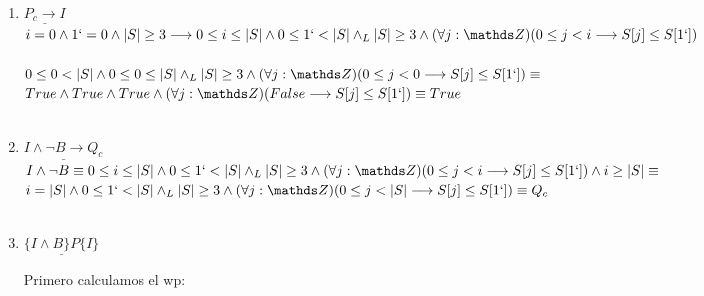 \documentclass[10pt,a4paper]{article}
\begin{document}
\begin{enumerate}

    \newpage
    \item $\underline{P_c\longrightarrow I}$\\

    $i=0 \land 1`=0 \land |S|\geq 3 \longrightarrow 0\leq i \leq |S| \land 0 \leq 1`<|S|  \land_L |S| \geq 3 \land (\forall j: \ent)(0\leq j < i \longrightarrow S[j]\leq S[1`])$\\

    \\

    $0\leq 0<|S| \land 0 \leq 0 \leq |S|  \land_L |S| \geq 3 \land (\forall j: \ent)(0\leq j < 0 \longrightarrow S[j]\leq S[1`]) \equiv$\\

    $True \land True \land True \land (\forall j: \ent)(False \longrightarrow S[j]\leq S[1`]) \equiv True$\\

    \\
        
    \item  $\underline{I\land \neg B \longrightarrow Q_c }$\\
        
        $I \land \neg B \equiv 0\leq i \leq |S| \land 0 \leq 1`<|S|  \land_L |S| \geq 3 \land (\forall j: \ent)(0\leq j < i \longrightarrow S[j]\leq S[1`]) \land i\geq |S|\equiv$\\

        $i=|S| \land 0 \leq 1`<|S|  \land_L |S| \geq 3 \land (\forall j: \ent)(0\leq j < |S| \longrightarrow S[j]\leq S[1`]) \equiv Q_c $\\

        \\
        

        
    
    \item $\underline{\{ I \land B \}P \{ I \}}$

    {Primero calculamos el wp:}\\
        

\end{enumerate}
\end{document}
